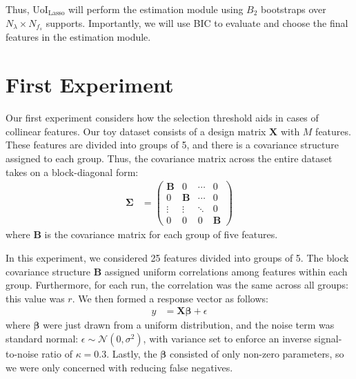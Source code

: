 \documentclass[11pt]{article}
\begin{document}
	Thus, UoI$_{\text{Lasso}}$ will perform the estimation module using $B_2$ bootstraps over $N_{\lambda}\times N_{f_s}$ supports. Importantly, we will use BIC to evaluate and choose the final features in the estimation module.
	
\section{First Experiment}
	Our first experiment considers how the selection threshold aids in cases of collinear features. Our toy dataset consists of a design matrix $\mathbf{X}$ with $M$ features. These features are divided into groups of 5, and there is a covariance structure assigned to each group. Thus, the covariance matrix across the entire dataset takes on a block-diagonal form:
	\begin{align}
		\boldsymbol{\Sigma} &= \left(
			\begin{array}{cccc}
			\mathbf{B} &	0 & \cdots  &	0\\
				0			 & \mathbf{B} & \cdots & 0 \\
			\vdots		 & 	\vdots			& \ddots & 0 \\
			0 & 0 & 0  & \mathbf{B}
			\end{array}
		\right)
	\end{align}
	where $\mathbf{B}$ is the covariance matrix for each group of five features. 
	
	In this experiment, we considered 25 features divided into groups of 5. The block covariance structure $\mathbf{B}$ assigned uniform correlations among features within each group. Furthermore, for each run, the correlation was the same across all groups: this value was $r$. We then formed a response vector as follows:
	\begin{align}
		y &= \mathbf{X}\boldsymbol{\beta} + \epsilon
	\end{align}
	where $\boldsymbol{\beta}$ were just drawn from a uniform distribution, and the noise term was standard normal: $\epsilon \sim \mathcal{N}(0, \sigma^2)$, with variance set to enforce an inverse signal-to-noise ratio of $\kappa=0.3$. Lastly, the $\boldsymbol{\beta}$ consisted of only non-zero parameters, so we were only concerned with reducing false negatives.
	
\end{document}
